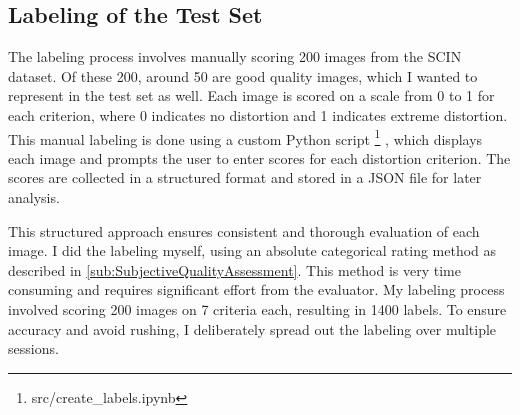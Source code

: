 \subsection{Labeling of the Test Set}
\label{sub:LabelingTestSet}
The labeling process involves manually scoring 200 images from the SCIN dataset. Of these 200, around 50 are good quality images, which I wanted to represent in the test set as well. Each image is scored on a scale from 0 to 1 for each criterion, where 0 indicates no distortion and 1 indicates extreme distortion. This manual labeling is done using a custom Python script \footnote{src/create\_labels.ipynb} , which displays each image and prompts the user to enter scores for each distortion criterion. The scores are collected in a structured format and stored in a JSON file for later analysis. \par
\vspace{\baselineskip}
\noindent
This structured approach ensures consistent and thorough evaluation of each image. I did the labeling myself, using an absolute categorical rating method as described in \autoref{sub:SubjectiveQualityAssessment}. This method is very time consuming and requires significant effort from the evaluator. My labeling process involved scoring 200 images on 7 criteria each, resulting in 1400 labels. To ensure accuracy and avoid rushing, I deliberately spread out the labeling over multiple sessions.\par
\noindent
